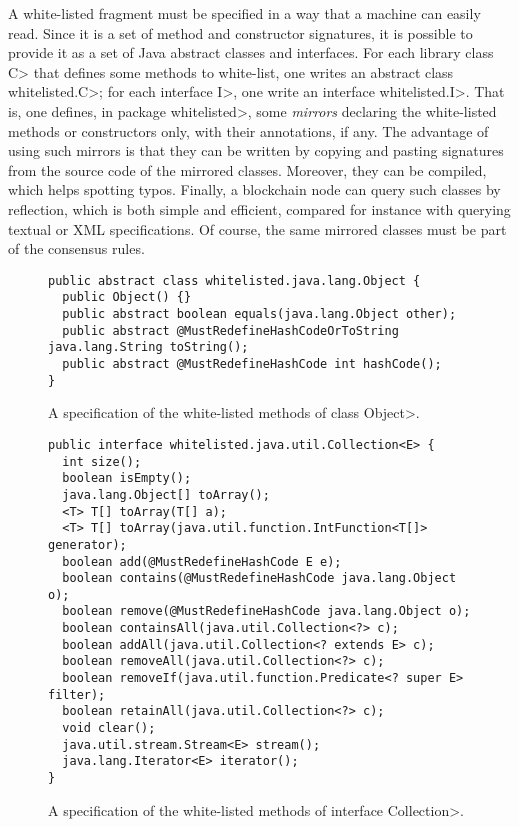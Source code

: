 A white-listed fragment must be specified in a way that a machine can easily read.
Since it is a set of method and constructor signatures, it is possible to provide it
as a set of Java abstract classes and interfaces. For each library class \<C> that defines some
methods to white-list, one writes an abstract class \<whitelisted.C>;
for each interface \<I>, one write an interface \<whitelisted.I>. That is, one defines,
in package \<whitelisted>, some \emph{mirrors} declaring the white-listed methods or
constructors only, with their annotations, if any.
The advantage of using such mirrors is that they can be written by copying and pasting
signatures from the source code of the mirrored classes. Moreover, they can be compiled,
which helps spotting typos. Finally, a blockchain node can query such classes by reflection,
which is both simple and efficient, compared for instance with querying textual or XML
specifications. Of course, the same mirrored classes must be part of the consensus rules.

\begin{figure}[t]
\begin{verbatim}
public abstract class whitelisted.java.lang.Object {
  public Object() {}
  public abstract boolean equals(java.lang.Object other);
  public abstract @MustRedefineHashCodeOrToString java.lang.String toString();
  public abstract @MustRedefineHashCode int hashCode();
}
\end{verbatim}
\caption{A specification of the white-listed methods of class \<Object>.}
\label{fig:white_listed_Object}
\end{figure}

\begin{figure}[t]
\begin{verbatim}
public interface whitelisted.java.util.Collection<E> {
  int size();
  boolean isEmpty();
  java.lang.Object[] toArray();
  <T> T[] toArray(T[] a);
  <T> T[] toArray(java.util.function.IntFunction<T[]> generator);
  boolean add(@MustRedefineHashCode E e);
  boolean contains(@MustRedefineHashCode java.lang.Object o);
  boolean remove(@MustRedefineHashCode java.lang.Object o);
  boolean containsAll(java.util.Collection<?> c);
  boolean addAll(java.util.Collection<? extends E> c);
  boolean removeAll(java.util.Collection<?> c);
  boolean removeIf(java.util.function.Predicate<? super E> filter);
  boolean retainAll(java.util.Collection<?> c);
  void clear();
  java.util.stream.Stream<E> stream();
  java.lang.Iterator<E> iterator();
}
\end{verbatim}
\caption{A specification of the white-listed methods of interface \<Collection>.}
\label{fig:white_listed_Collection}
\end{figure}

